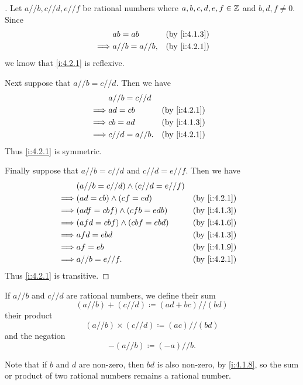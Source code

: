 \begin{proof}[]
  Let \(a // b, c // d, e // f\) be rational numbers where \(a, b, c, d, e, f \in \mathbb{Z}\) and \(b, d, f \neq 0\).
  Since
  \begin{align*}
             & ab = ab          &  & \by{i:4.1.3} \\
    \implies & a // b = a // b, &  & \by{i:4.2.1}
  \end{align*}
  we know that \cref{i:4.2.1} is reflexive.

  Next suppose that \(a // b = c // d\).
  Then we have
  \begin{align*}
             & a // b = c // d                    \\
    \implies & ad = cb          &  & \by{i:4.2.1} \\
    \implies & cb = ad          &  & \by{i:4.1.3} \\
    \implies & c // d = a // b. &  & \by{i:4.2.1}
  \end{align*}
  Thus \cref{i:4.2.1} is symmetric.

  Finally suppose that \(a // b = c // d\) and \(c // d = e // f\).
  Then we have
  \begin{align*}
             & (a // b = c // d) \land (c // d = e // f)                   \\
    \implies & (ad = cb) \land (cf = ed)                 &  & \by{i:4.2.1} \\
    \implies & (adf = cbf) \land (cfb = edb)             &  & \by{i:4.1.3} \\
    \implies & (afd = cbf) \land (cbf = ebd)             &  & \by{i:4.1.6} \\
    \implies & afd = ebd                                 &  & \by{i:4.1.3} \\
    \implies & af = eb                                   &  & \by{i:4.1.9} \\
    \implies & a // b = e // f.                          &  & \by{i:4.2.1}
  \end{align*}
  Thus \cref{i:4.2.1} is transitive.
\end{proof}

\begin{defn}\label{i:4.2.2}
  If \(a // b\) and \(c // d\) are rational numbers, we define their sum
  \[
    (a // b) + (c // d) \coloneqq (ad + bc) // (bd)
  \]
  their product
  \[
    (a // b) \times (c // d) \coloneqq (ac) // (bd)
  \]
  and the negation
  \[
    -(a // b) \coloneqq (-a) // b.
  \]

  Note that if \(b\) and \(d\) are non-zero, then \(bd\) is also non-zero, by \cref{i:4.1.8}, so the sum or product of two rational numbers remains a rational number.
\end{defn}

